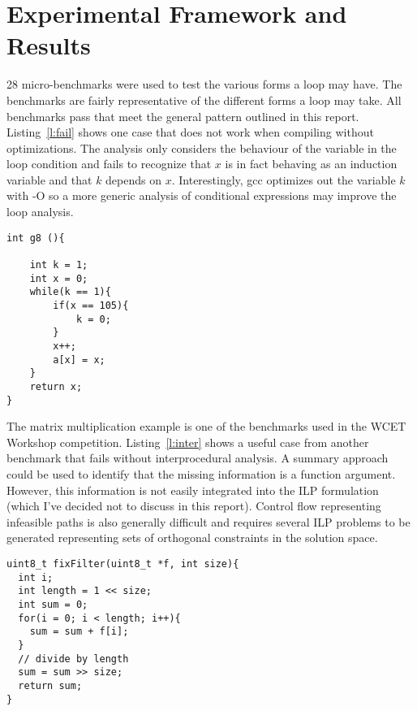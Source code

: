 

\section{Experimental Framework and Results}
28 micro-benchmarks were used to test the various forms a loop may have. The benchmarks are fairly representative of the different forms a loop may take. All benchmarks pass that meet the general pattern outlined in this report. Listing~\ref{l:fail} shows one case that does not work when compiling without optimizations. The analysis only considers the behaviour of the variable in the loop condition and fails to recognize that $x$ is in fact behaving as an induction variable and that $k$ depends on $x$. Interestingly, gcc optimizes out the variable $k$ with -O so a more generic analysis of conditional expressions may improve the loop analysis.

\begin{lstlisting}[caption={Indirect test on induction variable fails.},label=l:fail]
int g8 (){

	int k = 1;
	int x = 0;
	while(k == 1){
		if(x == 105){
			k = 0;
		}
		x++;
		a[x] = x;
	}
	return x;
}
\end{lstlisting}

The matrix multiplication example is one of the benchmarks used in the WCET Workshop competition. Listing~\ref{l:inter} shows a useful case from another benchmark that fails without interprocedural analysis. A summary approach could be used to identify that the missing information is a function argument. However, this information is not easily integrated into the ILP formulation (which I've decided not to discuss in this report). Control flow representing infeasible paths is also generally difficult and requires several ILP problems to be generated representing sets of orthogonal constraints in the solution space. 

\begin{lstlisting}[caption={Interprocedural analysis is necessary to analyze programs that call a function which takes the threshold as an argument.},label={l:inter}]
uint8_t fixFilter(uint8_t *f, int size){
  int i;
  int length = 1 << size;
  int sum = 0;
  for(i = 0; i < length; i++){
    sum = sum + f[i];	
  }   
  // divide by length
  sum = sum >> size;
  return sum;
}
\end{lstlisting}

